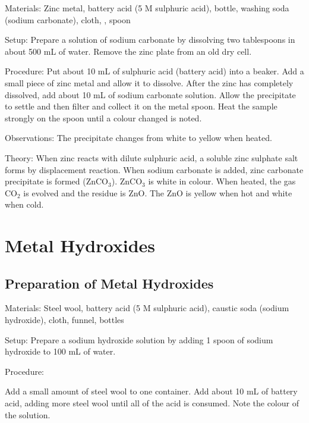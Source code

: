 \begin{multicols}{2}
\begin{description*}
\item[Materials:]{Zinc metal, battery acid (5 M sulphuric acid), bottle, washing soda (sodium
carbonate), cloth, , spoon}
\item[Setup:]{Prepare a solution of sodium carbonate by dissolving two tablespoons in
about 500 mL of water. Remove the zinc plate from an old dry cell.}
\item[Procedure:]{Put about 10 mL of sulphuric acid (battery acid) into a beaker. Add a small piece of zinc metal and allow it to dissolve. After the zinc has completely dissolved, add about 10 mL of sodium carbonate solution. Allow the precipitate to settle and then filter and collect it on the metal spoon. Heat the sample strongly on the spoon until a colour changed is noted.}
\item[Observations:]{The precipitate changes from white to yellow when heated.}
\item[Theory:]{When zinc reacts with dilute sulphuric acid, a soluble zinc sulphate salt
forms by displacement reaction. When sodium carbonate
is added, zinc carbonate precipitate is formed (ZnCO$_3$). ZnCO$_3$ is white in
colour. When heated, the gas CO$_2$ is evolved and
the residue is ZnO. The ZnO is yellow when hot and white when cold.}
\end{description*}


\section*{Metal Hydroxides}


\subsection{Preparation of Metal Hydroxides}


\begin{description*}
\item[Materials:]{Steel wool, battery acid (5 M sulphuric acid), caustic soda (sodium hydroxide), cloth, funnel, bottles}
\item[Setup:]{Prepare a sodium hydroxide solution by adding 1 spoon of sodium hydroxide
to 100 mL of water.}
\item[Procedure:]{Add a small amount of steel wool to one container. Add about 10 mL of battery acid, adding more steel wool until all of the acid is consumed. Note the colour of the solution. 

}
\end{description*}
\end{multicols}
